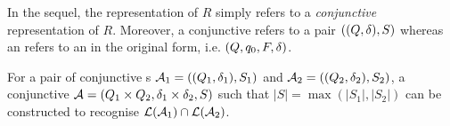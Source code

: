 

In the sequel, %
the representation of $R$ simply refers to a \emph{conjunctive} representation of $R$. Moreover, a conjunctive \FA{} refers to a pair $((Q, \delta), S)$ whereas an \FA{} refers to an \FA{} in the original form, i.e. $(Q, q_0, F, \delta)$.
%
\begin{proposition}\label{prop-conj-fa-prod}
For a pair of conjunctive \FA{}s $\mathcal{A}_1 = ((Q_1, \delta_1), S_1)$ and $\mathcal{A}_2 = ((Q_2, \delta_2), S_2)$, a conjunctive \FA{} $\mathcal{A} = (Q_1 \times Q_2, \delta_1 \times \delta_2, S)$ such that $|S| = \max(|S_1|, |S_2|)$ can be constructed to recognise $\mathcal{L}(\mathcal{A}_1) \cap \mathcal{L}(\mathcal{A}_2)$. 
\end{proposition}


